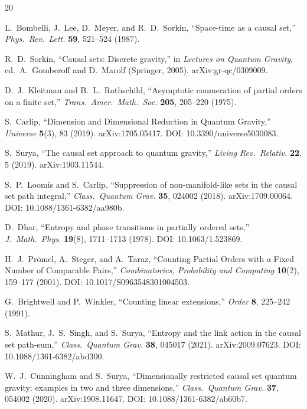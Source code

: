 \documentclass[12pt,a4paper]{article}
\begin{document}
\begin{thebibliography}{20}

L.~Bombelli, J.~Lee, D.~Meyer, and R.~D.~Sorkin,
``Space-time as a causal set,''
\textit{Phys.\ Rev.\ Lett.} \textbf{59}, 521--524 (1987).

R.~D.~Sorkin,
``Causal sets: Discrete gravity,''
in \textit{Lectures on Quantum Gravity}, ed.\ A.~Gomberoff and D.~Marolf
(Springer, 2005). arXiv:gr-qc/0309009.

D.~J.~Kleitman and B.~L.~Rothschild,
``Asymptotic enumeration of partial orders on a finite set,''
\textit{Trans.\ Amer.\ Math.\ Soc.} \textbf{205}, 205--220 (1975).

S.~Carlip,
``Dimension and Dimensional Reduction in Quantum Gravity,''
\textit{Universe} \textbf{5}(3), 83 (2019).
arXiv:1705.05417.
DOI: 10.3390/universe5030083.

S.~Surya,
``The causal set approach to quantum gravity,''
\textit{Living Rev.\ Relativ.} \textbf{22}, 5 (2019).
arXiv:1903.11544.

S.~P.~Loomis and S.~Carlip,
``Suppression of non-manifold-like sets in the causal set path integral,''
\textit{Class.\ Quantum Grav.} \textbf{35}, 024002 (2018).
arXiv:1709.00064.
DOI: 10.1088/1361-6382/aa980b.

D.~Dhar,
``Entropy and phase transitions in partially ordered sets,''
\textit{J.\ Math.\ Phys.} \textbf{19}(8), 1711--1713 (1978).
DOI: 10.1063/1.523869.

H.~J.~Pr{\"o}mel, A.~Steger, and A.~Taraz,
``Counting Partial Orders with a Fixed Number of Comparable Pairs,''
\textit{Combinatorics, Probability and Computing} \textbf{10}(2), 159--177 (2001).
DOI: 10.1017/S0963548301004503.

G.~Brightwell and P.~Winkler,
``Counting linear extensions,''
\textit{Order} \textbf{8}, 225--242 (1991).

S.~Mathur, J.~S.~Singh, and S.~Surya,
``Entropy and the link action in the causal set path-sum,''
\textit{Class.\ Quantum Grav.} \textbf{38}, 045017 (2021).
arXiv:2009.07623.
DOI: 10.1088/1361-6382/abd300.

W.~J.~Cunningham and S.~Surya,
``Dimensionally restricted causal set quantum gravity: examples in two and
three dimensions,''
\textit{Class.\ Quantum Grav.} \textbf{37}, 054002 (2020).
arXiv:1908.11647.
DOI: 10.1088/1361-6382/ab60b7.


\end{thebibliography}
\end{document}
